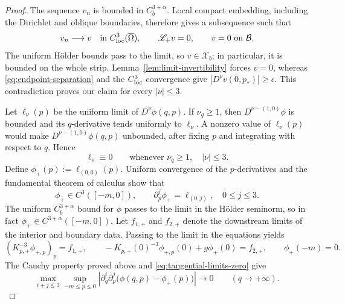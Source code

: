 \documentclass[12pt,letterpaper]{amsart}
\numberwithin{equation}{section}
\begin{document}
\begin{proof}
		The sequence \(v_n\) is bounded in \(C_b^{3+\alpha}\).  Local compact 	embedding, including the Dirichlet and oblique boundaries, therefore gives a	subsequence such that
		\begin{equation*}
			v_n\longrightarrow v\quad\hbox{in }C_{\rm loc}^{3}(\overline\Omega),
			\qquad {\mathscr L_+}v=0,\qquad v=0\ \hbox{on }\mathcal B .
		\end{equation*}
		The uniform H\"older bounds pass to the limit, so \(v\in\mathscr X_b\); in particular, it is bounded on the whole strip.  Lemma~\ref{lem:limit-invertibility}
		forces \(v=0\), whereas \eqref{eq:endpoint-separation} and the
		\(C^3_{\rm loc}\) convergence give \(|D^\nu v(0,p_*)|\ge\epsilon\).
		This contradiction proves our claim for every
		\(|\nu|\le3\).
		
		Let \(\ell_\nu(p)\) be the uniform limit of $D^\nu\phi(q,p)$.  If \(\nu_q\ge1\), then
		\(D^{\nu-(1,0)}\phi\) is bounded and its \(q\)-derivative tends uniformly to
		\(\ell_\nu\).  A nonzero value of \(\ell_\nu(p)\) would make
		\(D^{\nu-(1,0)}\phi(q,p)\) unbounded, after fixing
		\(p\) and integrating with respect to \(q\).   Hence
		\begin{equation}\label{eq:tangential-limits-zero}
			\ell_\nu\equiv0\qquad\text{whenever }\nu_q\ge1,\quad |\nu|\le3.
		\end{equation}
		Define \(\phi_+(p):=\ell_{(0,0)}(p)\).  Uniform convergence of the
		{$p$-derivatives and the fundamental theorem of calculus show that}
		\[
		\phi_+\in C^3([-m,0]),\qquad
		\partial_p^j\phi_+=\ell_{(0,j)},\quad 0\le j\le3.
		\]
		The uniform \(C_b^{3+\alpha}\) bound for \(\phi\) passes to the limit in
		the H\"older seminorm, so in fact \(\phi_+\in C^{3+\alpha}([-m,0])\).
	 {Let $f_{1,+}$ and $f_{2,+}$ denote the downstream limits of the interior and boundary data. Passing to the limit in the equations yields}
		\begin{equation*}
			(K_{p,+}^{-3}\phi_{+,p})_p=f_{1,+},\qquad
			-K_{p,+}(0)^{-3}\phi_{+,p}(0)+g\phi_+(0)=f_{2,+},\qquad
			\phi_+(-m)=0 .
		\end{equation*}
	{The Cauchy property proved above and \eqref{eq:tangential-limits-zero} give}
		\begin{equation}\label{eq:full-endpoint-convergence}
			\max_{i+j\le3}\sup_{-m\le p\le0}
			\left|\partial_q^i\partial_p^j
			\bigl(\phi(q,p)-\phi_+(p)\bigr)\right|
			\longrightarrow0\qquad(q\to+\infty).
		\end{equation}
		

\end{proof}
\end{document}
